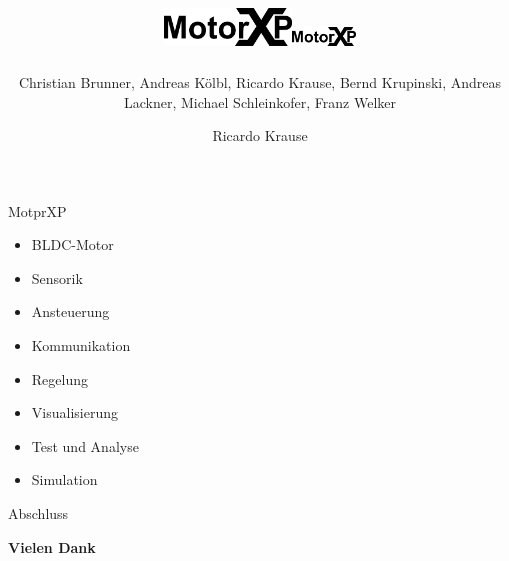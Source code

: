 \documentclass[14pt]{beamer}
\title{\includegraphics[height=1cm]{../images/MotorXP}}
\author{Christian Brunner, Andreas Kölbl, Ricardo Krause, Bernd Krupinski, Andreas Lackner, Michael Schleinkofer, Franz Welker}
\begin{document}
\begingroup
\makeatletter
\setlength{\hoffset}{-.5\beamer@sidebarwidth}
\makeatother
\begin{frame}[plain]
  \titlepage
\end{frame}
\endgroup
  \title{\includegraphics[height=0.5cm]{../images/MotorXP}}
  \author{Ricardo Krause}

\begin{frame}{MotprXP}
\begin{itemize}
	\item BLDC-Motor
	\item Sensorik
	\item Ansteuerung
	\item Kommunikation
	\item Regelung
	\item Visualisierung
	\item Test und Analyse
	\item Simulation
\end{itemize}
\end{frame}












\begin{frame}{Abschluss}
\centering 
	\begin{huge}
		\textbf{Vielen Dank}
	\end{huge}
\end{frame}
\end{document}
